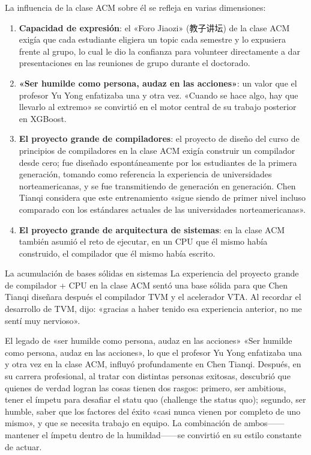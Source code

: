 La influencia de la clase ACM sobre él se refleja en varias dimensiones:

\begin{enumerate}
    \item \textbf{Capacidad de expresión}: el «Foro Jiaozi» (教子讲坛) de la clase ACM exigía que cada estudiante eligiera un topic cada semestre y lo expusiera frente al grupo, lo cual le dio la confianza para volunteer directamente a dar presentaciones en las reuniones de grupo durante el doctorado.
    \item \textbf{«Ser humilde como persona, audaz en las acciones»}: un valor que el profesor Yu Yong enfatizaba una y otra vez. «Cuando se hace algo, hay que llevarlo al extremo» se convirtió en el motor central de su trabajo posterior en XGBoost.
    \item \textbf{El proyecto grande de compiladores}: el proyecto de diseño del curso de principios de compiladores en la clase ACM exigía construir un compilador desde cero; fue diseñado espontáneamente por los estudiantes de la primera generación, tomando como referencia la experiencia de universidades norteamericanas, y se fue transmitiendo de generación en generación. Chen Tianqi considera que este entrenamiento «sigue siendo de primer nivel incluso comparado con los estándares actuales de las universidades norteamericanas».
    \item \textbf{El proyecto grande de arquitectura de sistemas}: en la clase ACM también asumió el reto de ejecutar, en un CPU que él mismo había construido, el compilador que él mismo había escrito.
\end{enumerate}

\begin{importantbox}{La acumulación de bases sólidas en sistemas}
La experiencia del proyecto grande de compilador + CPU en la clase ACM sentó una base sólida para que Chen Tianqi diseñara después el compilador TVM y el acelerador VTA. Al recordar el desarrollo de TVM, dijo: «gracias a haber tenido esa experiencia anterior, no me sentí muy nervioso».
\end{importantbox}

\begin{importantbox}{El legado de «ser humilde como persona, audaz en las acciones»}
«Ser humilde como persona, audaz en las acciones», lo que el profesor Yu Yong enfatizaba una y otra vez en la clase ACM, influyó profundamente en Chen Tianqi. Después, en su carrera profesional, al tratar con distintas personas exitosas, descubrió que quienes de verdad logran las cosas tienen dos rasgos: primero, ser ambitious, tener el ímpetu para desafiar el statu quo (challenge the status quo); segundo, ser humble, saber que los factores del éxito «casi nunca vienen por completo de uno mismo», y que se necesita trabajo en equipo. La combinación de ambos------mantener el ímpetu dentro de la humildad------se convirtió en su estilo constante de actuar.
\end{importantbox}

